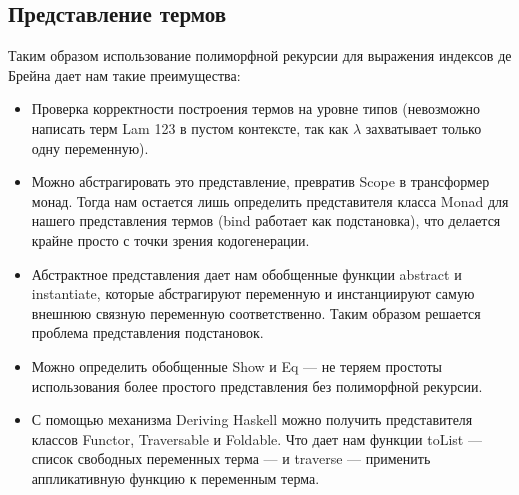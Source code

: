 \subsection{Представление термов}\label{de_brujin_impl}

Таким образом использование полиморфной рекурсии для выражения индексов де Брейна дает нам такие преимущества:
\begin{itemize}
  \item Проверка корректности построения термов на уровне типов (невозможно написать терм Lam 123 в пустом контексте, так как $\lambda$ захватывает только одну переменную).
  \item Можно абстрагировать это представление, превратив Scope в трансформер монад. Тогда нам остается лишь определить представителя класса Monad для нашего представления термов (bind работает как подстановка), что делается крайне просто с точки зрения кодогенерации.
  \item Абстрактное представления дает нам обобщенные функции abstract и instantiate, которые абстрагируют переменную и инстанциируют самую внешнюю связную переменную соответственно. Таким образом решается проблема представления подстановок.
  \item Можно определить обобщенные Show и Eq --- не теряем простоты использования более простого представления без полиморфной рекурсии.
  \item С помощью механизма Deriving Haskell можно получить представителя классов Functor, Traversable и Foldable. Что дает нам функции toList --- список свободных переменных терма --- и traverse --- применить аппликативную функцию к переменным терма.

\end{itemize}
